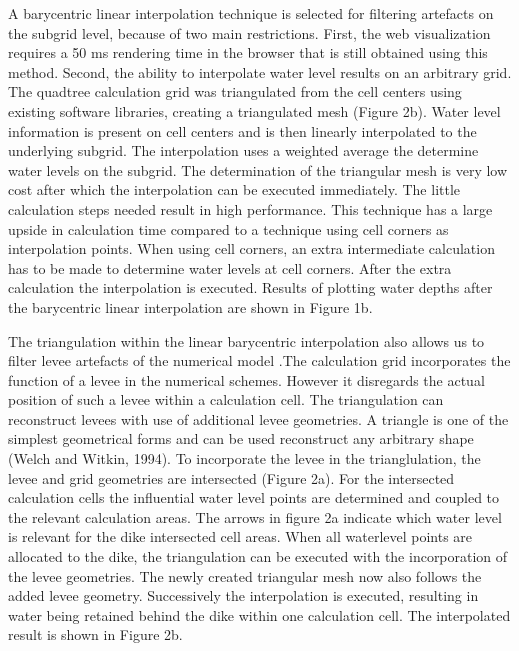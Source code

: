 \documentclass[a4paper]{article}
\begin{document}
A barycentric linear interpolation technique is selected for filtering artefacts on the subgrid level, because of two main restrictions. First, the web visualization requires a 50 ms rendering time in the browser that is still obtained using this method. Second, the ability to interpolate water level results on an arbitrary grid. The quadtree calculation grid was triangulated from the cell centers using existing software libraries, creating a triangulated mesh (Figure 2b). Water level information is present on cell centers and is then linearly interpolated to the underlying subgrid. The interpolation uses a weighted average the determine water levels on the subgrid. The determination of the triangular mesh is very low cost after which the interpolation can be executed immediately. The little calculation steps needed result in high performance. This technique has a large upside in calculation time compared to a technique using cell corners as interpolation points. When using cell corners, an extra intermediate calculation has to be made to determine water levels at cell corners. After the extra calculation the interpolation is executed. Results of plotting water depths after the barycentric linear interpolation are shown in Figure 1b.

The triangulation within the linear barycentric interpolation also allows us to filter levee artefacts of the numerical model .The calculation grid incorporates the function of a levee in the numerical schemes. However it disregards the actual position of such a levee within a calculation cell. The triangulation can reconstruct levees with use of additional levee geometries. A triangle is one of the simplest geometrical forms and can be used reconstruct any arbitrary shape (Welch and Witkin, 1994). To incorporate the levee in the trianglulation, the levee and grid geometries are intersected (Figure 2a). For the intersected calculation cells the influential water level points are determined and coupled to the relevant calculation areas. The arrows in figure 2a indicate which water level is relevant for the dike intersected cell areas. When all waterlevel points are allocated to the dike, the triangulation can be executed with the incorporation of the levee geometries. The newly created triangular mesh now also follows the added levee geometry. Successively the interpolation is executed, resulting in water being retained behind the dike within one calculation cell. The interpolated result is shown in Figure 2b.
\end{document}
